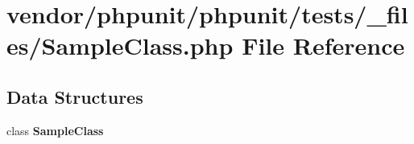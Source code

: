 \section{vendor/phpunit/phpunit/tests/\+\_\+files/\+Sample\+Class.php File Reference}
\label{phpunit_2phpunit_2tests_2__files_2_sample_class_8php}
\subsection*{Data Structures}
\begin{DoxyCompactItemize}
\item 
class {\bf Sample\+Class}
\end{DoxyCompactItemize}
